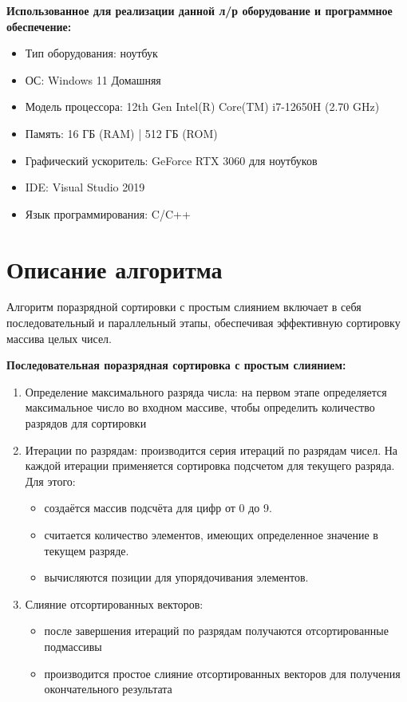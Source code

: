 \documentclass[a4paper, 14pt]{article}
\theoremstyle{plain}
\begin{document}
\textbf{Использованное для реализации данной л/р оборудование и программное обеспечение:} 
\vspace{-1em}
\begin{itemize}[leftmargin=3em]
	\setlength\itemsep{0cm}
	\item Тип оборудования: ноутбук
	\item ОС: Windows 11 Домашняя
	\item Модель процессора: 12th Gen Intel(R) Core(TM) i7-12650H (2.70 GHz)
	\item Память: 16 ГБ (RAM) | 512 ГБ (ROM)
	\item Графический ускоритель: GeForce RTX 3060 для ноутбуков
	\item IDE: Visual Studio 2019
	\item Язык программирования: C/C++
\end{itemize}


\newpage
\section*{\centering Описание алгоритма}
Алгоритм поразрядной сортировки с простым слиянием включает в себя последовательный и параллельный этапы, обеспечивая эффективную сортировку массива целых чисел.

\textbf{Последовательная поразрядная сортировка с простым слиянием:}
\vspace{-2.5em}
\begin{enumerate}[leftmargin=3em]
	\setlength\itemsep{0cm}
	\item Определение максимального разряда числа: на первом этапе определяется максимальное число во входном массиве, чтобы определить количество разрядов для сортировки
	\item Итерации по разрядам: производится серия итераций по разрядам чисел. На каждой итерации применяется сортировка подсчетом для текущего разряда. Для этого: \vspace{-0.3cm}
	\begin{itemize}
	\setlength\itemsep{0cm}
	\item создаётся массив подсчёта для цифр от 0 до 9.
	\item считается количество элементов, имеющих определенное значение в текущем разряде.
	\item вычисляются позиции для упорядочивания элементов.
	\end{itemize}
	\item Слияние отсортированных векторов: 
	\vspace{-0.3cm}
	\begin{itemize}
	\setlength\itemsep{0cm}
	\item после завершения итераций по разрядам получаются отсортированные подмассивы
	\item производится простое слияние отсортированных векторов для получения окончательного результата
	\end{itemize}
\end{enumerate}
\end{document}

